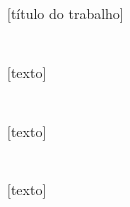\documentclass[a4paper, 11pt]{article}
\begin{document}






	\begin{center}
		\huge [título do trabalho]
	\end{center}


\section{}

[texto]



\section{}

[texto]


\section{}

[texto]



\pagebreak
\printbibliography[title={\underline{Referências:}}]
\end{document}
